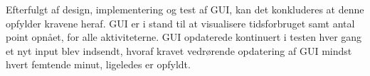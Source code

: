 Efterfulgt af design, implementering og test af GUI, kan det konkluderes at denne opfylder kravene heraf. GUI er i stand til at visualisere tidsforbruget samt antal point opnået, for alle aktiviteterne. GUI opdaterede kontinuert i testen hver gang et nyt input blev indsendt, hvoraf kravet vedrørende opdatering af GUI mindst hvert femtende minut, ligeledes er opfyldt.